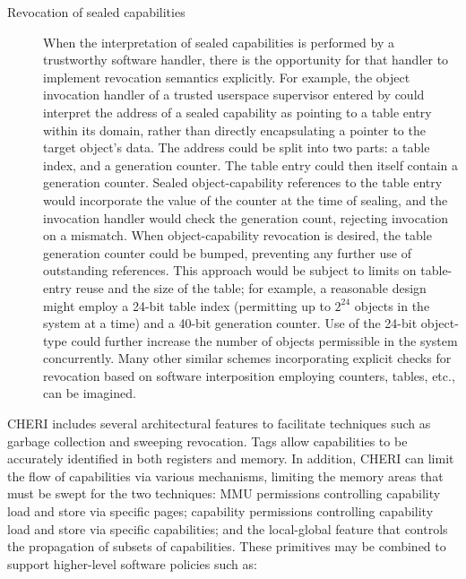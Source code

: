 \begin{description}
\item[Revocation of sealed capabilities]
  When the interpretation of sealed capabilities is performed by a trustworthy
  software handler, there is the opportunity for that
  handler to implement revocation semantics explicitly.
  For example, the object invocation handler of a trusted userspace
  supervisor entered by 
  could interpret the
  address of a sealed capability as pointing to a table entry
  within its domain,
  rather than directly encapsulating a pointer to the target object's data.
  The address could be split into two parts: a table index, and a generation
  counter.
  The table entry could then itself contain a generation counter.
  Sealed object-capability references to the table entry would incorporate
  the value of the counter at the time of sealing, and the invocation handler
  would check the generation count, rejecting invocation on a mismatch.
  When object-capability revocation is desired, the table generation counter
  could be bumped, preventing any further use of outstanding references.
  This approach would be subject to limits on table-entry reuse and the size
  of the table; for example, a reasonable design might employ a 24-bit table
  index (permitting up to $2^{24}$ objects in the system at a time) and a
  40-bit generation counter.
  Use of the 24-bit object-type could further increase the number of objects
  permissible in the system concurrently.
  Many other similar schemes incorporating explicit checks for revocation
  based on software interposition employing counters, tables, etc., can be
  imagined.
\end{description}

CHERI includes several architectural features to facilitate techniques such
as garbage collection and sweeping revocation.
Tags allow capabilities to be accurately identified in both registers and
memory.
In addition, CHERI can limit the flow of capabilities via various mechanisms,
limiting the memory areas that must be swept for the two techniques: MMU
permissions controlling capability load and store via specific pages;
capability permissions controlling capability load and store via specific
capabilities; and the local-global feature that controls the propagation of
subsets of capabilities.
These primitives may be combined to support higher-level software policies
such as:

